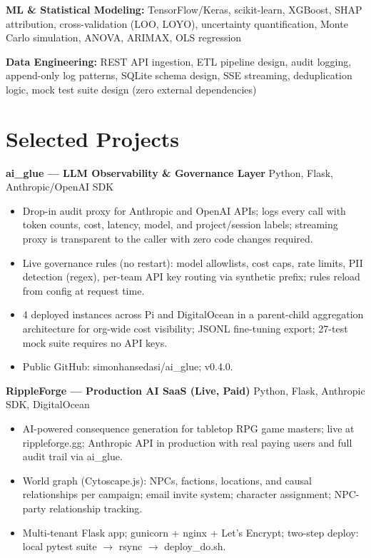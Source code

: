 \documentclass[11pt,a4paper]{article}
\begin{document}
\noindent
\textbf{ML \& Statistical Modeling:} TensorFlow/Keras, scikit-learn, XGBoost, SHAP attribution, cross-validation (LOO, LOYO), uncertainty quantification, Monte Carlo simulation, ANOVA, ARIMAX, OLS regression

\noindent
\textbf{Data Engineering:} REST API ingestion, ETL pipeline design, audit logging, append-only log patterns, SQLite schema design, SSE streaming, deduplication logic, mock test suite design (zero external dependencies)

\section*{Selected Projects}

\noindent
\textbf{ai\_glue --- LLM Observability \& Governance Layer} \hfill Python, Flask, Anthropic/OpenAI SDK
\begin{itemize}
    \item Drop-in audit proxy for Anthropic and OpenAI APIs; logs every call with token counts, cost, latency, model, and project/session labels; streaming proxy is transparent to the caller with zero code changes required.
    \item Live governance rules (no restart): model allowlists, cost caps, rate limits, PII detection (regex), per-team API key routing via synthetic prefix; rules reload from config at request time.
    \item 4 deployed instances across Pi and DigitalOcean in a parent-child aggregation architecture for org-wide cost visibility; JSONL fine-tuning export; 27-test mock suite requires no API keys.
    \item Public GitHub: simonhansedasi/ai\_glue; v0.4.0.
\end{itemize}

\vspace{0.2cm}
\noindent
\textbf{RippleForge --- Production AI SaaS (Live, Paid)} \hfill Python, Flask, Anthropic SDK, DigitalOcean
\begin{itemize}
    \item AI-powered consequence generation for tabletop RPG game masters; live at rippleforge.gg; Anthropic API in production with real paying users and full audit trail via ai\_glue.
    \item World graph (Cytoscape.js): NPCs, factions, locations, and causal relationships per campaign; email invite system; character assignment; NPC-party relationship tracking.
    \item Multi-tenant Flask app; gunicorn + nginx + Let's Encrypt; two-step deploy: local pytest suite $\rightarrow$ rsync $\rightarrow$ deploy\_do.sh.
\end{itemize}
\end{document}
